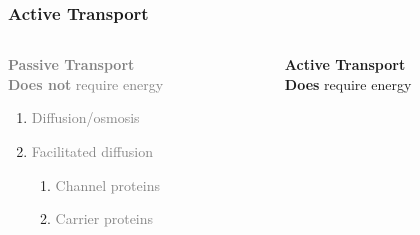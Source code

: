 \documentclass[10pt]{beamer}
\begin{document}
\begin{frame}[t]
\frametitle{Active Transport}
\vspace{1.0cm}

	\begin{columns}[t]
		\begin{column}{0.5\textwidth}
			\Large{\textbf{\textcolor{gray}{Passive Transport}}}\normalsize{}\\
			\medskip
			\textcolor{gray}{\textbf{Does not} require energy}\\
				\begin{enumerate}
					\item \textcolor{gray}{Diffusion/osmosis}
					\item \textcolor{gray}{Facilitated diffusion}
						\begin{enumerate}
							\item \textcolor{gray}{Channel proteins}
							\item \textcolor{gray}{Carrier proteins}
						\end{enumerate}
				\end{enumerate}
		\end{column}
		
		\begin{column}{0.5\textwidth}
			\Large{\textbf{\textcolor{myblue}{Active Transport}}}\normalsize{}\\
			\medskip
			\textbf{Does} require energy
		\end{column}
	\end{columns}
\end{frame}
\end{document}
